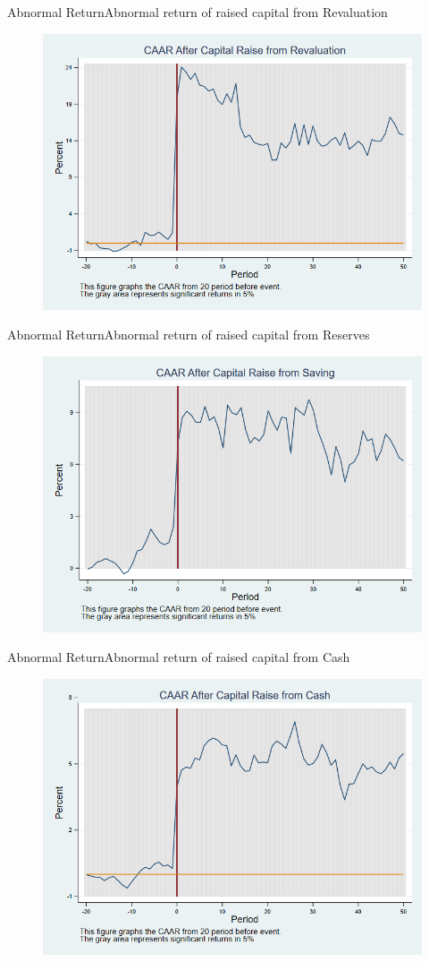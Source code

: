 \documentclass{beamer}
\begin{document}
\begin{frame}{Abnormal Return}{Abnormal return of raised capital from Revaluation}
	\label{car_abnormalreturn2Revaluation}
	\begin{figure}
		\centering
		\includegraphics[width=0.65\linewidth]{Output/car_abnormalreturn2Revaluation.png}
		\label{fig:car_abnormalreturn2Revaluation}
	\end{figure}
\end{frame}


\begin{frame}{Abnormal Return}{Abnormal return of raised capital from Reserves}
	\label{car_abnormalreturn2Saving}
	\begin{figure}
		\centering
		\includegraphics[width=0.65\linewidth]{Output/car_abnormalreturn2Saving.png}
		\label{fig:car_abnormalreturn2Saving}
	\end{figure}
\end{frame}


\begin{frame}{Abnormal Return}{Abnormal return of raised capital from Cash}
	\label{car_abnormalreturn2Cash}
	\begin{figure}
		\centering
		\includegraphics[width=0.65\linewidth]{Output/car_abnormalreturn2Cash.png}
		\label{fig:car_abnormalreturn2Cash}
	\end{figure}
	
\end{frame}
\end{document}
